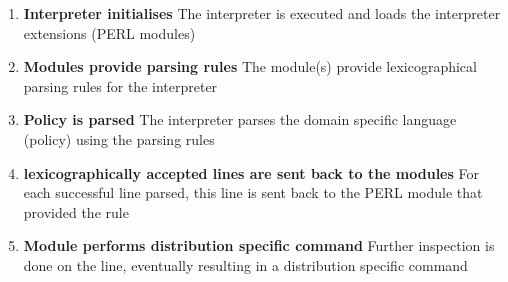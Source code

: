 {\begin{multicols}{2}
\begin{enumerate}
					\item \textbf{Interpreter initialises}	
						\newline								
						The interpreter is executed and loads the interpreter extensions (PERL modules)
						
					\item \textbf{Modules provide parsing rules}	
						\newline								
						The module(s) provide lexicographical parsing rules for the interpreter
						
					\item \textbf{Policy is parsed}	
						\newline								
						The interpreter parses the domain specific language (policy) using the parsing rules
						
				\columnbreak
						
					\item \textbf{lexicographically accepted lines are sent back to the modules}	
						\newline								
						For each successful line parsed, this line is sent back to the PERL module that provided the rule			
						
					\item \textbf{Module performs distribution specific command}	
						\newline								
						Further inspection is done on the line, eventually resulting in a distribution specific command				

				\end{enumerate}	
				
			\end{multicols}
		}		

